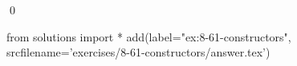 
\begin{ex}
  \label{ex:8-61-constructors}
  
  \qed
\end{ex}
\begin{python0}
from solutions import *
add(label="ex:8-61-constructors",
    srcfilename='exercises/8-61-constructors/answer.tex')
\end{python0}

